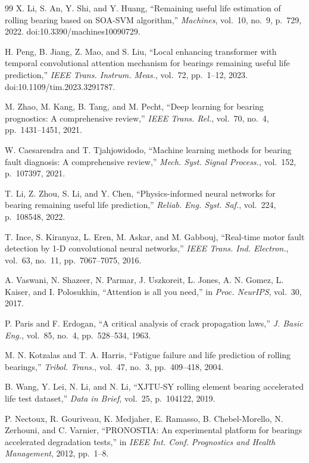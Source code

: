 \documentclass[pdflatex,sn-mathphys-num]{sn-jnl}
\begin{document}
\begin{thebibliography}{99}
X. Li, S. An, Y. Shi, and Y. Huang,
``Remaining useful life estimation of rolling bearing based on SOA-SVM algorithm,''
\textit{Machines}, vol.~10, no.~9, p.~729, 2022. doi:10.3390/machines10090729.

H. Peng, B. Jiang, Z. Mao, and S. Liu,
``Local enhancing transformer with temporal convolutional attention mechanism for bearings remaining useful life prediction,''
\textit{IEEE Trans. Instrum. Meas.}, vol.~72, pp.~1--12, 2023. doi:10.1109/tim.2023.3291787.

M. Zhao, M. Kang, B. Tang, and M. Pecht,
``Deep learning for bearing prognostics: A comprehensive review,''
\textit{IEEE Trans. Rel.}, vol.~70, no.~4, pp.~1431--1451, 2021.

W. Caesarendra and T. Tjahjowidodo,
``Machine learning methods for bearing fault diagnosis: A comprehensive review,''
\textit{Mech. Syst. Signal Process.}, vol.~152, p.~107397, 2021.

T. Li, Z. Zhou, S. Li, and Y. Chen,
``Physics-informed neural networks for bearing remaining useful life prediction,''
\textit{Reliab. Eng. Syst. Saf.}, vol.~224, p.~108548, 2022.

T. Ince, S. Kiranyaz, L. Eren, M. Askar, and M. Gabbouj,
``Real-time motor fault detection by 1-D convolutional neural networks,''
\textit{IEEE Trans. Ind. Electron.}, vol.~63, no.~11, pp.~7067--7075, 2016.

A. Vaswani, N. Shazeer, N. Parmar, J. Uszkoreit, L. Jones, A. N. Gomez, L. Kaiser, and I. Polosukhin,
``Attention is all you need,''
in \textit{Proc. NeurIPS}, vol.~30, 2017.

P. Paris and F. Erdogan,
``A critical analysis of crack propagation laws,''
\textit{J. Basic Eng.}, vol.~85, no.~4, pp.~528--534, 1963.

M. N. Kotzalas and T. A. Harris,
``Fatigue failure and life prediction of rolling bearings,''
\textit{Tribol. Trans.}, vol.~47, no.~3, pp.~409--418, 2004.

B. Wang, Y. Lei, N. Li, and N. Li,
``XJTU-SY rolling element bearing accelerated life test dataset,''
\textit{Data in Brief}, vol.~25, p.~104122, 2019.

P. Nectoux, R. Gouriveau, K. Medjaher, E. Ramasso, B. Chebel-Morello, N. Zerhouni, and C. Varnier,
``PRONOSTIA: An experimental platform for bearings accelerated degradation tests,''
in \textit{IEEE Int. Conf. Prognostics and Health Management}, 2012, pp.~1--8.


\end{thebibliography}
\end{document}
